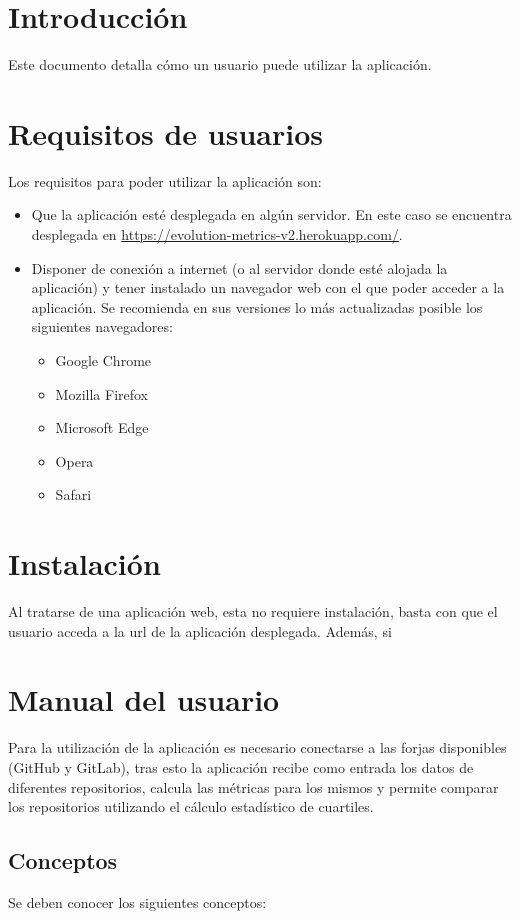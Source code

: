\label{anex:D}

\section{Introducción}
Este documento detalla cómo un usuario puede utilizar la aplicación.
\section{Requisitos de usuarios}
Los requisitos para poder utilizar la aplicación son:
\begin{itemize}
	\tightlist
	\item Que la aplicación esté desplegada en algún servidor. En este caso se encuentra desplegada en \url{https://evolution-metrics-v2.herokuapp.com/}.
	\item Disponer de conexión a internet (o al servidor donde esté alojada la aplicación) y tener instalado un navegador web con el que poder acceder a la aplicación. Se recomienda en sus versiones lo más actualizadas posible los siguientes navegadores:
	\begin{itemize}
		\tightlist
		\item Google Chrome
		\item Mozilla Firefox
		\item Microsoft Edge
		\item Opera
		\item Safari
	\end{itemize}
\end{itemize}

\section{Instalación}
Al tratarse de una aplicación web, esta no requiere instalación, basta con que el usuario acceda a la url de la aplicación desplegada. Además, si 

\section{Manual del usuario}
Para la utilización de la aplicación es necesario conectarse a las forjas disponibles (GitHub y GitLab), tras esto la aplicación recibe como entrada los datos de diferentes repositorios, calcula las métricas para los mismos y permite comparar los repositorios utilizando el cálculo estadístico de cuartiles.

\subsection{Conceptos}
Se deben conocer los siguientes conceptos:

